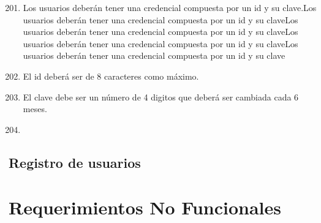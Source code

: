 \begin{flushright}

	\begin{enumerate} [label=RF-\arabic*. , align=left]
		\setcounter{enumi}{200}	 %
		\item 
		Los usuarios deberán tener una credencial compuesta por un id y su clave.Los usuarios deberán tener una credencial compuesta por un id y su claveLos usuarios deberán tener una credencial compuesta por un id y su claveLos usuarios deberán tener una credencial compuesta por un id y su claveLos usuarios deberán tener una credencial compuesta por un id y su clave
		\item  
		El id deberá ser de 8 caracteres como máximo.
		\item  
		El clave debe ser un número de 4 digitos que deberá ser cambiada cada 6 meses.
		\item \blindtext
	\end{enumerate}

\end{flushright}

\subsection{Registro de usuarios}


\section{Requerimientos No Funcionales}


